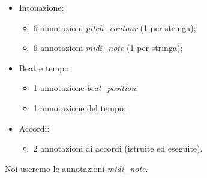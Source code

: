 \begin{itemize}
	\item Intonazione:
	\begin{itemize}
		\item 6 annotazioni \textit{pitch\_contour} (1 per stringa);
		\item 6 annotazioni \textit{midi\_note} (1 per stringa);
	\end{itemize}
	\item Beat e tempo:
	\begin{itemize}
		\item 1 annotazione \textit{beat\_position};
		\item 1 annotazione del tempo;
	\end{itemize}
	\item Accordi:
	\begin{itemize}
		\item 2 annotazioni di accordi (istruite ed eseguite).
	\end{itemize}
\end{itemize}
Noi useremo le annotazioni \textit{midi\_note}.
